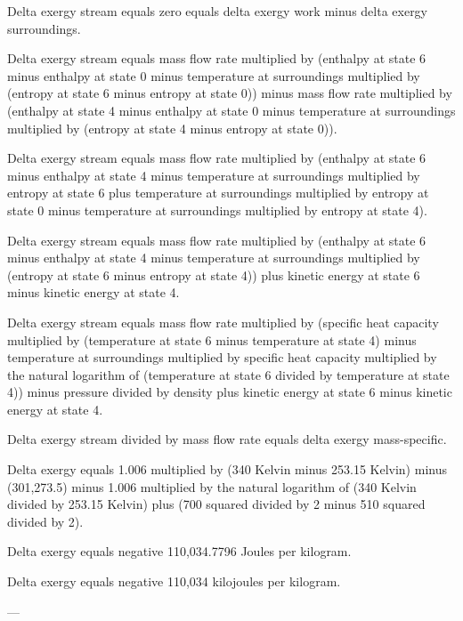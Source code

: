 Delta exergy stream equals zero equals delta exergy work minus delta exergy surroundings.  

Delta exergy stream equals mass flow rate multiplied by (enthalpy at state 6 minus enthalpy at state 0 minus temperature at surroundings multiplied by (entropy at state 6 minus entropy at state 0)) minus mass flow rate multiplied by (enthalpy at state 4 minus enthalpy at state 0 minus temperature at surroundings multiplied by (entropy at state 4 minus entropy at state 0)).  

Delta exergy stream equals mass flow rate multiplied by (enthalpy at state 6 minus enthalpy at state 4 minus temperature at surroundings multiplied by entropy at state 6 plus temperature at surroundings multiplied by entropy at state 0 minus temperature at surroundings multiplied by entropy at state 4).  

Delta exergy stream equals mass flow rate multiplied by (enthalpy at state 6 minus enthalpy at state 4 minus temperature at surroundings multiplied by (entropy at state 6 minus entropy at state 4)) plus kinetic energy at state 6 minus kinetic energy at state 4.  

Delta exergy stream equals mass flow rate multiplied by (specific heat capacity multiplied by (temperature at state 6 minus temperature at state 4) minus temperature at surroundings multiplied by specific heat capacity multiplied by the natural logarithm of (temperature at state 6 divided by temperature at state 4)) minus pressure divided by density plus kinetic energy at state 6 minus kinetic energy at state 4.  

Delta exergy stream divided by mass flow rate equals delta exergy mass-specific.  

Delta exergy equals 1.006 multiplied by (340 Kelvin minus 253.15 Kelvin) minus (301,273.5) minus 1.006 multiplied by the natural logarithm of (340 Kelvin divided by 253.15 Kelvin) plus (700 squared divided by 2 minus 510 squared divided by 2).  

Delta exergy equals negative 110,034.7796 Joules per kilogram.  

Delta exergy equals negative 110,034 kilojoules per kilogram.  

---